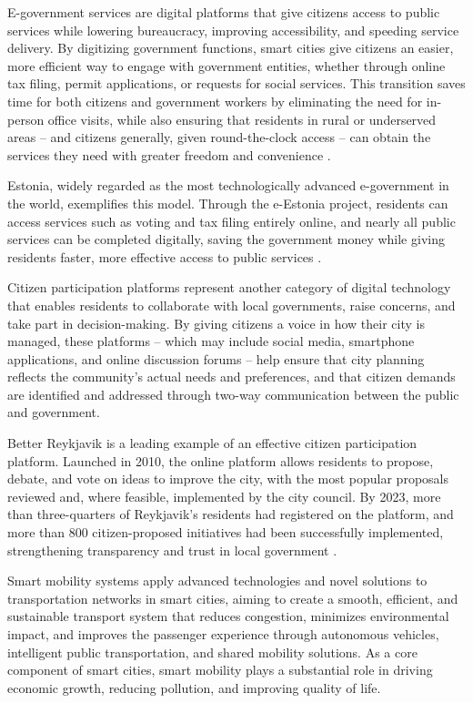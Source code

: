 \documentclass[journal]{IEEEtran}
\begin{document}
E-government services are digital platforms that give citizens access to public services while lowering bureaucracy, improving accessibility, and speeding service delivery. By digitizing government functions, smart cities give citizens an easier, more efficient way to engage with government entities, whether through online tax filing, permit applications, or requests for social services. This transition saves time for both citizens and government workers by eliminating the need for in-person office visits, while also ensuring that residents in rural or underserved areas -- and citizens generally, given round-the-clock access -- can obtain the services they need with greater freedom and convenience \cite{r73,r100}.

Estonia, widely regarded as the most technologically advanced e-government in the world, exemplifies this model. Through the e-Estonia project, residents can access services such as voting and tax filing entirely online, and nearly all public services can be completed digitally, saving the government money while giving residents faster, more effective access to public services \cite{r74,r101}.

Citizen participation platforms represent another category of digital technology that enables residents to collaborate with local governments, raise concerns, and take part in decision-making. By giving citizens a voice in how their city is managed, these platforms -- which may include social media, smartphone applications, and online discussion forums -- help ensure that city planning reflects the community's actual needs and preferences, and that citizen demands are identified and addressed through two-way communication between the public and government.

Better Reykjavik is a leading example of an effective citizen participation platform. Launched in 2010, the online platform allows residents to propose, debate, and vote on ideas to improve the city, with the most popular proposals reviewed and, where feasible, implemented by the city council. By 2023, more than three-quarters of Reykjavik's residents had registered on the platform, and more than 800 citizen-proposed initiatives had been successfully implemented, strengthening transparency and trust in local government \cite{r75,r102}.

Smart mobility systems apply advanced technologies and novel solutions to transportation networks in smart cities, aiming to create a smooth, efficient, and sustainable transport system that reduces congestion, minimizes environmental impact, and improves the passenger experience through autonomous vehicles, intelligent public transportation, and shared mobility solutions. As a core component of smart cities, smart mobility plays a substantial role in driving economic growth, reducing pollution, and improving quality of life.
\end{document}
